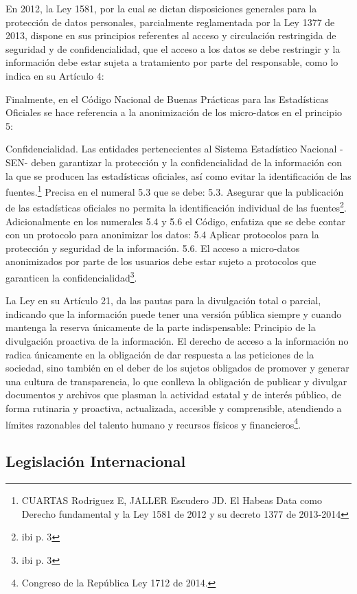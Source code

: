 \documentclass[a4paper,openright,12pt]{book}
\theoremstyle{definition}
\theoremstyle{remark}
\begin{document}
En 2012, la Ley 1581, por la cual se dictan disposiciones generales para la protección de datos personales, parcialmente reglamentada por la Ley 1377 de 2013, dispone en sus principios referentes al acceso y circulación restringida de seguridad y de confidencialidad, que el acceso a los datos se debe restringir y la información debe estar sujeta a tratamiento por parte del responsable, como lo indica en su Artículo 4:

Finalmente, en el Código Nacional de Buenas Prácticas para las Estadísticas Oficiales se hace referencia a la anonimización de los micro-datos en el principio 5:

Confidencialidad. Las entidades pertenecientes al Sistema Estadístico Nacional -SEN- deben garantizar la protección y la confidencialidad de la información con la que se producen las estadísticas oficiales, así como evitar la identificación de las fuentes.\footnote{CUARTAS Rodriguez E, JALLER Escudero JD. El Habeas Data como Derecho fundamental y la Ley 1581 de 2012 y su decreto 1377 de 2013-2014}
Precisa en el numeral 5.3 que se debe:
5.3. Asegurar que la publicación de las estadísticas oficiales no permita la identificación individual de las fuentes\footnote{ibi p. 3}.
Adicionalmente en los numerales 5.4 y 5.6 el Código, enfatiza que se debe contar con un protocolo para anonimizar los datos:
5.4 Aplicar protocolos para la protección y seguridad de la información. 5.6. El acceso a micro-datos anonimizados por parte de los usuarios debe estar sujeto a protocolos que garanticen la confidencialidad\footnote{ibi p. 3}.

La Ley en su Artículo 21, da las pautas para la divulgación total o parcial, indicando que la información puede tener una versión pública siempre y cuando mantenga la reserva únicamente de la parte indispensable:
Principio de la divulgación proactiva de la información. El derecho de acceso a la información no radica únicamente en la obligación de dar respuesta a las peticiones de la sociedad, sino también en el deber de los sujetos obligados de promover y generar una cultura de transparencia, lo que conlleva la obligación de publicar y divulgar documentos y archivos que plasman la actividad estatal y de interés público, de forma rutinaria y proactiva, actualizada, accesible y comprensible, atendiendo a límites razonables del talento humano y recursos físicos y financieros\footnote{Congreso de la República Ley 1712 de 2014.}.

\subsection{Legislación Internacional}
\end{document}

